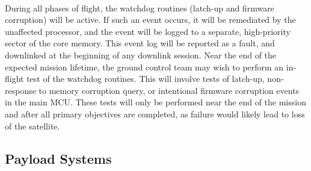 \documentclass[nocover]            %
{CSLI}                       %
\begin{document}
\\During all phases of flight, the watchdog routines (latch-up and firmware corruption) will be active. If such an event occurs, it will be remediated by the unaffected processor, and the event will be logged to a separate, high-priority sector of the core memory. This event log will be reported as a fault, and downlinked at the beginning of any downlink session. Near the end of the expected mission lifetime, the ground control team may wish to perform an in-flight test of the watchdog routines. This will involve tests of latch-up, non-response to memory corruption query, or intentional firmware corruption events in the main MCU. These tests will only be performed near the end of the mission and after all primary objectives are completed, as failure would likely lead to loss of the satellite.
\subsection{Payload Systems}
\end{document}

